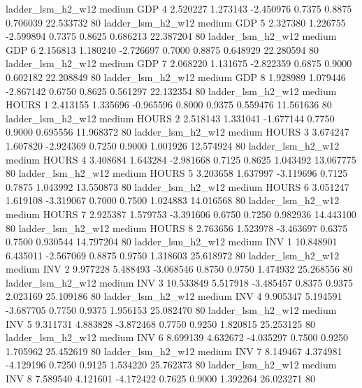      ladder_lsm_h2_w12     medium      GDP                 4  2.520227 1.273143 -2.450976 0.7375 0.8875  0.706039   22.533732 80
     ladder_lsm_h2_w12     medium      GDP                 5  2.327380 1.226755 -2.599894 0.7375 0.8625  0.686213   22.387204 80
     ladder_lsm_h2_w12     medium      GDP                 6  2.156813 1.180240 -2.726697 0.7000 0.8875  0.648929   22.280594 80
     ladder_lsm_h2_w12     medium      GDP                 7  2.068220 1.131675 -2.822359 0.6875 0.9000  0.602182   22.208849 80
     ladder_lsm_h2_w12     medium      GDP                 8  1.928989 1.079446 -2.867142 0.6750 0.8625  0.561297   22.132354 80
     ladder_lsm_h2_w12     medium    HOURS                 1  2.413155 1.335696 -0.965596 0.8000 0.9375  0.559476   11.561636 80
     ladder_lsm_h2_w12     medium    HOURS                 2  2.518143 1.331041 -1.677144 0.7750 0.9000  0.695556   11.968372 80
     ladder_lsm_h2_w12     medium    HOURS                 3  3.674247 1.607820 -2.924369 0.7250 0.9000  1.001926   12.574924 80
     ladder_lsm_h2_w12     medium    HOURS                 4  3.408684 1.643284 -2.981668 0.7125 0.8625  1.043492   13.067775 80
     ladder_lsm_h2_w12     medium    HOURS                 5  3.203658 1.637997 -3.119696 0.7125 0.7875  1.043992   13.550873 80
     ladder_lsm_h2_w12     medium    HOURS                 6  3.051247 1.619108 -3.319067 0.7000 0.7500  1.024883   14.016568 80
     ladder_lsm_h2_w12     medium    HOURS                 7  2.925387 1.579753 -3.391606 0.6750 0.7250  0.982936   14.443100 80
     ladder_lsm_h2_w12     medium    HOURS                 8  2.763656 1.523978 -3.463697 0.6375 0.7500  0.930544   14.797204 80
     ladder_lsm_h2_w12     medium      INV                 1 10.848901 6.435011 -2.567069 0.8875 0.9750  1.318603   25.618972 80
     ladder_lsm_h2_w12     medium      INV                 2  9.977228 5.488493 -3.068546 0.8750 0.9750  1.474932   25.268556 80
     ladder_lsm_h2_w12     medium      INV                 3 10.533849 5.517918 -3.485457 0.8375 0.9375  2.023169   25.109186 80
     ladder_lsm_h2_w12     medium      INV                 4  9.905347 5.194591 -3.687705 0.7750 0.9375  1.956153   25.082470 80
     ladder_lsm_h2_w12     medium      INV                 5  9.311731 4.883828 -3.872468 0.7750 0.9250  1.820815   25.253125 80
     ladder_lsm_h2_w12     medium      INV                 6  8.699139 4.632672 -4.035297 0.7500 0.9250  1.705962   25.452619 80
     ladder_lsm_h2_w12     medium      INV                 7  8.149467 4.374981 -4.129196 0.7250 0.9125  1.534220   25.762373 80
     ladder_lsm_h2_w12     medium      INV                 8  7.589540 4.121601 -4.172422 0.7625 0.9000  1.392264   26.023271 80
